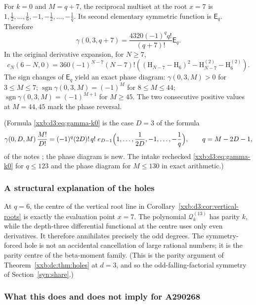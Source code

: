 \documentclass[11pt,a4paper]{article}
\numberwithin{equation}{section}
\theoremstyle{definition}
\theoremstyle{remark}
\theoremstyle{plain}
\DeclareMathOperator{\sgn}{sgn}
\begin{document}
For $k=0$ and $M=q+7$, the reciprocal multiset at the root $x=7$ is
$1,\frac12,\ldots,\frac16,-1,-\frac12,\ldots,-\frac1q$.
Its second elementary symmetric function is $\mathsf E_q$.  Therefore
\begin{equation}
 \label{xxb:d3:eq:gamma-k0}
 \gamma(0,3,q+7)
 =\frac{4320(-1)^qq!}{(q+7)!}\mathsf E_q.
\end{equation}
In the original derivative expansion, for $N\geq7$,
\begin{equation}
 \label{xxb:d3:eq:c-logfree}
 c_N(6-N,0)
 =360(-1)^{N-7}(N-7)!
 \left((\mathrm H_{N-7}-\mathrm H_6)^2-\mathrm H_{N-7}^{(2)}-\mathrm H_6^{(2)}\right).
\end{equation}
The sign changes of $\mathsf E_q$ yield an exact phase diagram:
$\gamma(0,3,M)>0$ for $3\leq M\leq7$;
$\sgn\gamma(0,3,M)=(-1)^M$ for $8\leq M\leq44$;
$\sgn\gamma(0,3,M)=(-1)^{M+1}$ for $M\geq45$.
The two consecutive positive values at $M=44,45$ mark the phase reversal.

(Formula \eqref{xxb:d3:eq:gamma-k0} is the case $D=3$ of the formula
\[
 \gamma(0,D,M)\,\frac{M!}{D!}=(-1)^q(2D)!\,q!\;
 e_{D-1}\Bigl(1,\ldots,\frac1{2D},-1,\ldots,-\frac1q\Bigr),\qquad q=M-2D-1,
\]
of the notes \cite{xxbd3-notes}; the phase diagram is new.  The intake
rechecked \eqref{xxb:d3:eq:gamma-k0} for $q\le123$ and the phase diagram for
$M\le130$ in exact arithmetic.)

\subsubsection{A structural explanation of the holes}

At $q=6$, the centre of the vertical root line in
Corollary~\ref{xxb:d3:cor:vertical-roots} is exactly the evaluation point
$x=7$.  The polynomial $\mathcal Q_k^{(13)}$ has parity $k$, while the
depth-three differential functional at the centre uses only even derivatives.
It therefore annihilates precisely the odd degrees.  The symmetry-forced hole
is not an accidental cancellation of large rational numbers; it is the parity
centre of the beta-moment family.  (This is the parity argument of
Theorem~\ref{xxb:dc:thm:holes} at $d=3$, and so the odd-falling-factorial
symmetry of Section~\ref{syn:share}.)

\subsubsection{What this does and does not imply for A290268}
\end{document}
